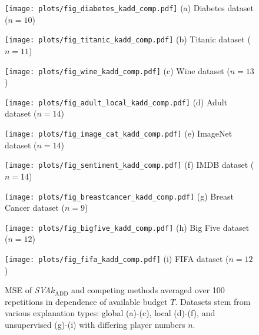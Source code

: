 \begin{figure*}[ht]
\centering
\begin{minipage}[c]{0.32\textwidth}
   \centering
   \texttt{[image: plots/fig\_diabetes\_kadd\_comp.pdf]}
   (a) Diabetes dataset ($n=10$)
   \label{fig:diabetes_kadd_comp}
\end{minipage}
\begin{minipage}[c]{0.32\textwidth}
    \centering
    \texttt{[image: plots/fig\_titanic\_kadd\_comp.pdf]}
    (b) Titanic dataset ($n=11$)
    \label{fig:titanic_kadd_comp}
\end{minipage}
\begin{minipage}[c]{0.32\textwidth}
    \centering
    \texttt{[image: plots/fig\_wine\_kadd\_comp.pdf]}
    (c) Wine dataset ($n=13$)
    \label{fig:wine_kadd_comp}
\end{minipage}
%
\begin{minipage}[c]{0.32\textwidth}
    \centering
    \texttt{[image: plots/fig\_adult\_local\_kadd\_comp.pdf]}
    (d) Adult dataset ($n=14$)
    \label{fig:adult_local_kadd_comp}
\end{minipage}
\begin{minipage}[c]{0.32\textwidth}
   \centering
   \texttt{[image: plots/fig\_image\_cat\_kadd\_comp.pdf]}
   (e) ImageNet dataset ($n=14$)
   \label{fig:image_cat_kadd_comp}
\end{minipage}
\begin{minipage}[c]{0.32\textwidth}
    \centering
    \texttt{[image: plots/fig\_sentiment\_kadd\_comp.pdf]}
    (f) IMDB dataset ($n=14$)
    \label{fig:sentiment_kadd_comp}
\end{minipage}
%
\begin{minipage}[c]{0.32\textwidth}
   \centering
   \texttt{[image: plots/fig\_breastcancer\_kadd\_comp.pdf]}
   (g) Breast Cancer dataset ($n=9$)
   \label{fig:breastcancer_kadd_comp}
\end{minipage}
\begin{minipage}[c]{0.32\textwidth}
    \centering
    \texttt{[image: plots/fig\_bigfive\_kadd\_comp.pdf]}
    (h) Big Five dataset ($n=12$)
    \label{fig:bigfive_kadd_comp}
\end{minipage}
\begin{minipage}[c]{0.32\textwidth}
    \centering
    \texttt{[image: plots/fig\_fifa\_kadd\_comp.pdf]}
    (i) FIFA dataset ($n=12$)
    \label{fig:fifa_kadd_comp}
\end{minipage}
\caption{
MSE of \emph{SVA}$k_{\text{ADD}}$ and competing methods averaged over 100 repetitions in dependence of available budget $T$.
Datasets stem from various explanation types: global (a)-(c), local (d)-(f), and unsupervised (g)-(i) with differing player numbers $n$.
}
\label{fig:results_comp}
\end{figure*}


